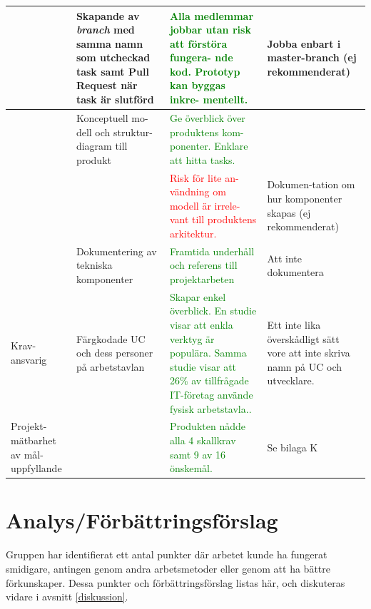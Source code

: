 \documentclass[conference]{IEEEtran}
\begin{document}
\begin{table}[h!tbp]
\begin{center}
\begin{tabular}{|L{0.15\columnwidth}|L{0.25\columnwidth}|L{0.25\columnwidth}|L{0.15\columnwidth}|}
            \hline
            
            & Skapande av \textit{branch} med samma namn som utcheckad task samt Pull Request när task är slutförd & \textcolor{green}{Alla medlemmar jobbar utan risk att förstöra fungera- \break nde kod. Prototyp kan byggas inkre- \break mentellt.} & Jobba enbart i master-branch (ej rekommenderat) \\
            
            \hline
            
            & Konceptuell mo- \break dell och struktur- \break diagram till produkt & \textcolor{green}{Ge överblick över produktens kom- \break ponenter. Enklare att hitta tasks.} & \\
            
            \hline
            
            & &\textcolor{red}{Risk för lite an- \break vändning om modell är irrele- \break vant till produktens arkitektur.} & Dokumen-\break tation om hur komponenter skapas (ej rekommenderat) \\
            
            \hline
            
            & Dokumentering av tekniska komponenter & \textcolor{green}{Framtida underhåll och referens till projektarbeten} & Att inte dokumentera \\
            
            \hline
            
            Krav-\break ansvarig & Färgkodade UC och dess personer på arbetstavlan & \textcolor{green}{Skapar enkel överblick. En studie visar att enkla verktyg är populära. Samma studie visar att 26\% av tillfrågade IT-företag använde fysisk arbetstavla.\cite{SurveyofAgileTool}.} & Ett inte lika överskådligt sätt vore att inte skriva namn på UC och utvecklare. \\

            \hline

            Projekt- mätbarhet av mål-\break uppfyllande & & \textcolor{green}{Produkten nådde alla 4 skallkrav samt 9 av 16 önskemål.} & Se bilaga K\\
            
            \hline
		\end{tabular}
		\label{tab:bedomning}
	\end{center}
\end{table}


\section{Analys/Förbättringsförslag}\label{analys}
Gruppen har identifierat ett antal punkter där arbetet kunde ha fungerat smidigare, antingen genom andra arbetsmetoder
eller genom att ha bättre förkunskaper. Dessa punkter och förbättringsförslag listas här, och diskuteras vidare i
avsnitt \ref{diskussion}.
\end{document}
